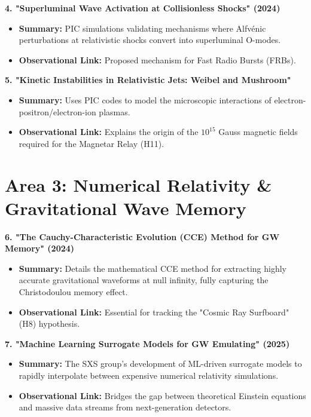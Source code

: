 \documentclass{article}
\begin{document}
\textbf{4. "Superluminal Wave Activation at Collisionless Shocks" (2024)}
\begin{itemize}
    \item \textbf{Summary:} PIC simulations validating mechanisms where Alfvénic perturbations at relativistic shocks convert into superluminal O-modes.
    \item \textbf{Observational Link:} Proposed mechanism for Fast Radio Bursts (FRBs).
\end{itemize}

\textbf{5. "Kinetic Instabilities in Relativistic Jets: Weibel and Mushroom"}
\begin{itemize}
    \item \textbf{Summary:} Uses PIC codes to model the microscopic interactions of electron-positron/electron-ion plasmas.
    \item \textbf{Observational Link:} Explains the origin of the $10^{15}$ Gauss magnetic fields required for the Magnetar Relay (H11).
\end{itemize}

\section*{Area 3: Numerical Relativity \& Gravitational Wave Memory}

\textbf{6. "The Cauchy-Characteristic Evolution (CCE) Method for GW Memory" (2024)}
\begin{itemize}
    \item \textbf{Summary:} Details the mathematical CCE method for extracting highly accurate gravitational waveforms at null infinity, fully capturing the Christodoulou memory effect.
    \item \textbf{Observational Link:} Essential for tracking the "Cosmic Ray Surfboard" (H8) hypothesis.
\end{itemize}

\textbf{7. "Machine Learning Surrogate Models for GW Emulating" (2025)}
\begin{itemize}
    \item \textbf{Summary:} The SXS group's development of ML-driven surrogate models to rapidly interpolate between expensive numerical relativity simulations.
    \item \textbf{Observational Link:} Bridges the gap between theoretical Einstein equations and massive data streams from next-generation detectors.
\end{itemize}
\end{document}
